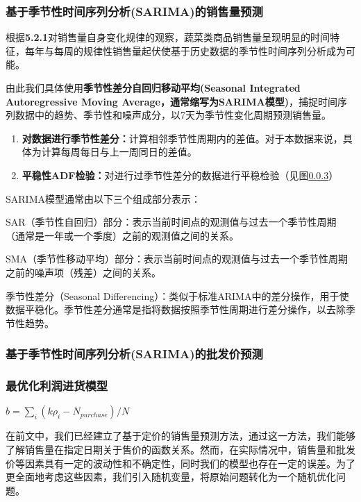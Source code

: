 \documentclass[withoutpreface,bwprint]{cumcmthesis} %
\begin{document}
 \subsubsection{基于季节性时间序列分析(SARIMA)的销售量预测}
    根据\textbf{5.2.1}对销售量自身变化规律的观察，蔬菜类商品销售量呈现明显的时间特征，每年与每周的规律性销售量起伏使基于历史数据的季节性时间序列分析成为可能。
    
    由此我们具体使用\textbf{季节性差分自回归移动平均(Seasonal Integrated Autoregressive Moving Average，通常缩写为SARIMA模型)}，捕捉时间序列数据中的趋势、季节性和噪声成分，以7天为季节性变化周期预测销售量。
    
    \begin{enumerate}
        \item \textbf{对数据进行季节性差分：}计算相邻季节性周期内的差值。对于本数据来说，具体为计算每周每日与上一周同日的差值。
        \item \textbf{平稳性ADF检验：}对进行过季节性差分的数据进行平稳检验（见图\ref{}）
    \end{enumerate}
    SARIMA模型通常由以下三个组成部分表示：

SAR（季节性自回归）部分：表示当前时间点的观测值与过去一个季节性周期（通常是一年或一个季度）之前的观测值之间的关系。

SMA（季节性移动平均）部分：表示当前时间点的观测值与过去一个季节性周期之前的噪声项（残差）之间的关系。

季节性差分（Seasonal Differencing）：类似于标准ARIMA中的差分操作，用于使数据平稳化。季节性差分通常是指将数据按照季节性周期进行差分操作，以去除季节性趋势。

 \subsubsection{基于季节性时间序列分析(SARIMA)的批发价预测}
 
 \subsubsection{最优化利润进货模型}
 $b=\sum_{i}(k\rho_i-N_{purchase})/N$
 
在前文中，我们已经建立了基于定价的销售量预测方法，通过这一方法，我们能够了解销售量在指定日期关于售价的函数关系。然而，在实际情况中，销售量和批发价等因素具有一定的波动性和不确定性，同时我们的模型也存在一定的误差。为了更全面地考虑这些因素，我们引入随机变量，将原始问题转化为一个随机优化问题。
\end{document}
